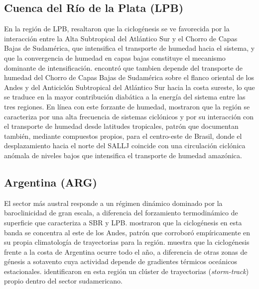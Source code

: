 \subsection{Cuenca del Río de la Plata (LPB)}\label{subsec:tb_lpb}
En la región de LPB, \citet{gramcianinov2024early} resaltaron que la ciclogénesis se ve favorecida por la interacción entre la Alta Subtropical del Atlántico Sur y el Chorro de Capas Bajas de Sudamérica, que intensifica el transporte de humedad hacia el sistema, y que la convergencia de humedad en capas bajas constituye el mecanismo dominante de intensificación.
\citet{coutodesouza2024thesis} encontró que tambien depende del transporte de humedad del Chorro de Capas Bajas de Sudamérica sobre el flanco oriental de los Andes y del Anticiclón Subtropical del Atlántico Sur hacia la costa sureste, lo que se traduce en la mayor contribución diabática a la energía del sistema entre las tres regiones.
En línea con este forzante de humedad, \citet{reboita2010south} mostraron que la región se caracteriza por una alta frecuencia de sistemas ciclónicos y por su interacción con el transporte de humedad desde latitudes tropicales, patrón que \citet{laureanti2024relation} documentan también, mediante compuestos propios, para el centro-este de Brasil, donde el desplazamiento hacia el norte del SALLJ coincide con una circulación ciclónica anómala de niveles bajos que intensifica el transporte de humedad amazónica.

\subsection{Argentina (ARG)}\label{subsec:tb_arg}
El sector más austral responde a un régimen dinámico dominado por la baroclinicidad de gran escala, a diferencia del forzamiento termodinámico de superficie que caracteriza a SBR y LPB.
\citet{hoskins2005new} mostraron que la ciclogénesis en esta banda se concentra al este de los Andes, patrón que \citet{coutodesouza2024thesis} corroboró empíricamente en su propia climatología de trayectorias para la región.
\citet{sinclair1995climatology} muestra que la ciclogénesis frente a la costa de Argentina ocurre todo el año, a diferencia de otras zonas de génesis a sotavento cuya actividad depende de gradientes térmicos oceánicos estacionales.
\citet{mendes2010climatology} identificaron en esta región un clúster de trayectorias (\textit{storm-track}) propio dentro del sector sudamericano.

